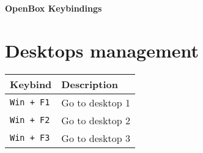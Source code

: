 \documentclass[letterpaper,12pt]{article}
\begin{document}
{\centering\textbf{\Large OpenBox Keybindings} \par}

\section*{Desktops management}
\begin{table}[H]
  \begin{tabular}{|C{5cm}|L{10cm}|}
    \hline
    \textbf{Keybind} & \textbf{Description} \\
    \hline
    {\tt Win + F1} & Go to desktop 1 \\
    {\tt Win + F2} & Go to desktop 2 \\
    {\tt Win + F3} & Go to desktop 3 \\
    \hline
  \end{tabular}
\end{table}
\end{document}
